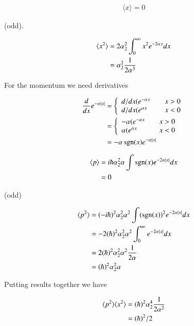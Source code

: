 \documentclass{article}
\DeclareMathOperator{\sgn}{sgn}
\newcommand{\expectation}[1]{\langle{#1}\rangle}
\begin{document}
\begin{align*}
\expectation{x} = 0
\end{align*}

(odd).

\begin{align*}
\expectation{x^2} 
&= 2 \alpha_2^2 \int_0^\infty x^2 e^{-2\alpha x} dx \\
&= \alpha_2^2 \inv{2 \alpha^3}
\end{align*}

For the momentum we need derivatives

\begin{align*}
\frac{d}{dx} e^{-\alpha \Abs{x}} 
&=
\left\{
\begin{array}{l l}
d/dx(e^{-\alpha x} & \quad \mbox{$x>0$} \\
d/dx(e^{\alpha x} & \quad \mbox{$x<0$} \\
\end{array}
\right. \\
&=
\left\{
\begin{array}{l l}
-\alpha (e^{-\alpha x} & \quad \mbox{$x>0$} \\
\alpha (e^{\alpha x} & \quad \mbox{$x<0$} \\
\end{array}
\right. \\
&=
-\alpha \sgn(x) e^{-\alpha \Abs{x}}
\end{align*}

\begin{align*}
\expectation{p} 
&= i \hbar \alpha_2^2 \alpha \int \sgn(x) e^{-2\alpha\Abs{x}} dx  \\
&= 0
\end{align*}

(odd)

\begin{align*}
\expectation{p^2} 
&= (-i \hbar)^2 \alpha_2^2 \alpha^2 \int (\sgn(x))^2 e^{-2\alpha\Abs{x}} dx  \\
&= - 2(\hbar)^2 \alpha_2^2 \alpha^2 \int_0^\infty e^{-2\alpha\Abs{x}} dx  \\
&= 2(\hbar)^2 \alpha_2^2 \alpha^2 \inv{2\alpha} \\
&= (\hbar)^2 \alpha_2^2 \alpha \\
\end{align*}

Putting results together we have

\begin{align*}
\expectation{p^2} \expectation{x^2} 
&= (\hbar)^2 \alpha_2^4 \inv{2 \alpha^2} \\
&= (\hbar)^2/2
\end{align*}
\end{document}
